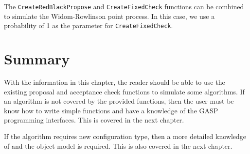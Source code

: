 The \texttt{CreateRedBlackPropose} and \texttt{CreateFixedCheck}
functions can be combined to simulate the Widom-Rowlinson point
process.  In this case, we use a probability of 1 as the parameter
for \texttt{CreateFixedCheck}.

\section{Summary}

With the information in this chapter, the reader should be able to use
the existing proposal and acceptance check functions to simulate some
algorithms.  If an algorithm is not covered by the provided functions,
then the user must be know how to write simple \GAP{} functions and
have a knowledge of the GASP programming interfaces.  This is covered
in the next chapter.

If the algorithm requires new configuration type, then a more detailed
knowledge of \GAP{} and the \GAP{} object model is required.  This is also
covered in the next chapter.

